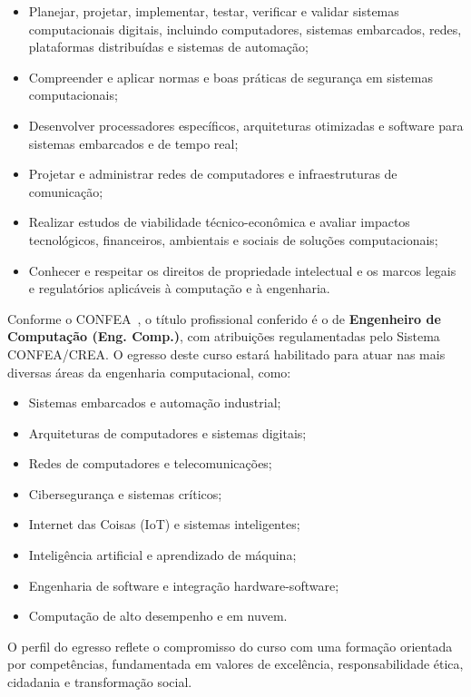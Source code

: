 \begin{itemize}
    \item Planejar, projetar, implementar, testar, verificar e validar sistemas computacionais digitais, incluindo computadores, sistemas embarcados, redes, plataformas distribuídas e sistemas de automação;
    \item Compreender e aplicar normas e boas práticas de segurança em sistemas computacionais;
    \item Desenvolver processadores específicos, arquiteturas otimizadas e software para sistemas embarcados e de tempo real;
    \item Projetar e administrar redes de computadores e infraestruturas de comunicação;
    \item Realizar estudos de viabilidade técnico-econômica e avaliar impactos tecnológicos, financeiros, ambientais e sociais de soluções computacionais;
    \item Conhecer e respeitar os direitos de propriedade intelectual e os marcos legais e regulatórios aplicáveis à computação e à engenharia.
\end{itemize}

Conforme o CONFEA~\cite{CONFEA:473:2002}, o título profissional conferido é o de \textbf{Engenheiro de Computação (Eng. Comp.)}, com atribuições regulamentadas pelo Sistema CONFEA/CREA. O egresso deste curso estará habilitado para atuar nas mais diversas áreas da engenharia computacional, como:

\begin{itemize}
    \item Sistemas embarcados e automação industrial;
    \item Arquiteturas de computadores e sistemas digitais;
    \item Redes de computadores e telecomunicações;
    \item Cibersegurança e sistemas críticos;
    \item Internet das Coisas (IoT) e sistemas inteligentes;
    \item Inteligência artificial e aprendizado de máquina;
    \item Engenharia de software e integração hardware-software;
    \item Computação de alto desempenho e em nuvem.
\end{itemize}

O perfil do egresso reflete o compromisso do curso com uma formação orientada por competências, fundamentada em valores de excelência, responsabilidade ética, cidadania e transformação social.

